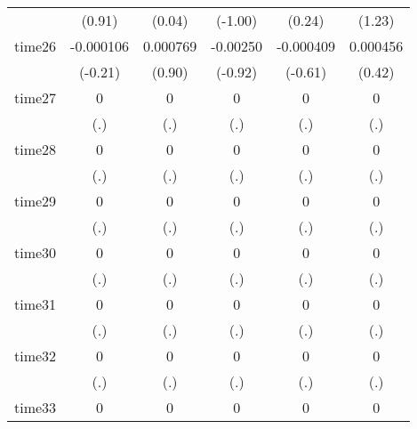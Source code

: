 \begin{table}[htbp]
\begin{tabular}{l*{5}{c}}
            &      (0.91)         &      (0.04)         &     (-1.00)         &      (0.24)         &      (1.23)         \\
time26      &   -0.000106         &    0.000769         &    -0.00250         &   -0.000409         &    0.000456         \\
            &     (-0.21)         &      (0.90)         &     (-0.92)         &     (-0.61)         &      (0.42)         \\
time27      &           0         &           0         &           0         &           0         &           0         \\
            &         (.)         &         (.)         &         (.)         &         (.)         &         (.)         \\
time28      &           0         &           0         &           0         &           0         &           0         \\
            &         (.)         &         (.)         &         (.)         &         (.)         &         (.)         \\
time29      &           0         &           0         &           0         &           0         &           0         \\
            &         (.)         &         (.)         &         (.)         &         (.)         &         (.)         \\
time30      &           0         &           0         &           0         &           0         &           0         \\
            &         (.)         &         (.)         &         (.)         &         (.)         &         (.)         \\
time31      &           0         &           0         &           0         &           0         &           0         \\
            &         (.)         &         (.)         &         (.)         &         (.)         &         (.)         \\
time32      &           0         &           0         &           0         &           0         &           0         \\
            &         (.)         &         (.)         &         (.)         &         (.)         &         (.)         \\
time33      &           0         &           0         &           0         &           0         &           0         \\

\end{tabular}
\end{table}
